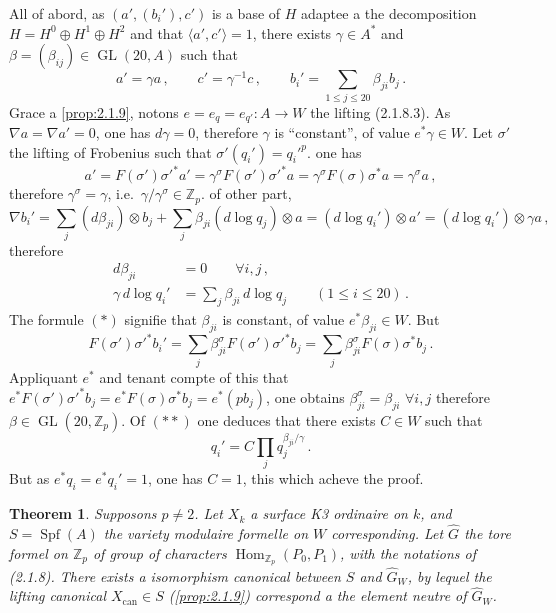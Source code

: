 \documentclass[12pt,a4paper]{article}
\theoremstyle{plain}
\newtheorem{theorem}{Theorem}[section]
\theoremstyle{definition}
\theoremstyle{remark}
\DeclareMathOperator{\Spf}{Spf}
\DeclareMathOperator{\Hom}{Hom}
\DeclareMathOperator{\GL}{GL}
\begin{document}
All of abord, as $(a', (b_i'), c')$ is a base of $H$ adaptee a the decomposition $H = H^0 \oplus H^1 \oplus H^2$ and that $\langle a', c'\rangle = 1$, there exists $\gamma \in A^*$ and $\beta = (\beta_{ij}) \in \GL(20, A)$ such that
\[
a' = \gamma a\,, \qquad c' = \gamma^{-1}c\,, \qquad b_i' = \sum_{1 \leq j \leq 20} \beta_{ji} b_j\,.\]
Grace a \ref{prop:2.1.9}, notons $e = e_q = e_{q'} : A \to W$ the lifting (2.1.8.3). As $\nabla a = \nabla a' = 0$, one has $d\gamma = 0$, therefore $\gamma$ is ``constant'', of value $e^*\gamma \in W$. Let $\sigma'$ the lifting of Frobenius such that $\sigma'(q_i') = q_i'^p$. one has
\[
a' = F(\sigma')\sigma'^*a' = \gamma^\sigma F(\sigma')\sigma'^*a = \gamma^\sigma F(\sigma)\sigma^*a = \gamma^\sigma a\,,
\]
therefore $\gamma^\sigma = \gamma$, i.e.\ $\gamma/\gamma^\sigma \in \mathbb{Z}_p$. of other part,
\[
\nabla b_i' = \sum_j (d\beta_{ji}) \otimes b_j + \sum_j \beta_{ji}(d\log q_j) \otimes a = (d\log q_i') \otimes a' = (d\log q_i') \otimes \gamma a\,,
\]
therefore
\begin{align*}
d\beta_{ji} &= 0 \qquad \forall i,j\,, \tag{$*$}\\
\gamma\, d\log q_i' &= \sum_j \beta_{ji}\, d\log q_j \qquad (1 \leq i \leq 20)\,. \tag{$**$}
\end{align*}
The formule $(*)$ signifie that $\beta_{ji}$ is constant, of value $e^*\beta_{ji} \in W$. But
\[
F(\sigma')\sigma'^*b_i' = \sum_j \beta_{ji}^\sigma F(\sigma')\sigma'^*b_j = \sum_j \beta_{ji}^\sigma F(\sigma)\sigma^*b_j\,.\]
Appliquant $e^*$ and tenant compte of this that $e^*F(\sigma')\sigma'^*b_j = e^*F(\sigma)\sigma^*b_j = e^*(pb_j)$, one obtains $\beta_{ji}^\sigma = \beta_{ji}$ $\forall i,j$ therefore $\beta \in \GL(20, \mathbb{Z}_p)$. Of $(**)$ one deduces that there exists $C \in W$ such that
\[
q_i' = C \prod_j q_j^{\beta_{ji}/\gamma}\,.\]
But as $e^*q_i = e^*q_i' = 1$, one has $C = 1$, this which acheve the proof.

\begin{theorem}\label{thm:2.1.14}
Supposons $p \neq 2$. Let $X_k$ a surface K3 ordinaire on $k$, and $S = \Spf(A)$ the variety modulaire formelle on $W$ corresponding. Let $\widehat{G}$ the tore formel on $\mathbb{Z}_p$ of group of characters $\Hom_{\mathbb{Z}_p}(P_0, P_1)$, with the notations of (2.1.8). There exists a isomorphism canonical between $S$ and $\widehat{G}_W$, by lequel the lifting canonical $X_{\mathrm{can}} \in S$ (\ref{prop:2.1.9}) correspond a the element neutre of $\widehat{G}_W$.
\end{theorem}
\end{document}
